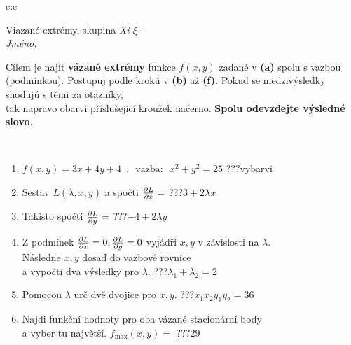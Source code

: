 \documentclass[10pt]{report}
\begin{document}
\begin{tabular}{c:c}
\begin{minipage}[c][104.5mm][t]{0.5\linewidth}
\begin{center}
\vspace{7mm}
{\huge Viazané extrémy, skupina \textit{Xi $\xi$} -}\\[5mm]
\textit{Jméno:}\phantom{xxxxxxxxxxxxxxxxxxxxxxxxxxxxxxxxxxxxxxxxxxxxxxxxxxxxxxxxxxxxxxxxx}\\[5mm]
\begin{minipage}{0.95\linewidth}
\begin{center}
Cílem je najít \textbf{vázané extrémy} funkce $f(x,y)$ zadané v \textbf{(a)} spolu s vazbou (podmínkou). Postupuj podle krokú v \textbf{(b)} až \textbf{(f)}. Pokud se medzivýsledky shodujú s těmi za otazníky,\\tak napravo obarvi příslušející kroužek načerno. \textbf{Spolu odevzdejte výsledné slovo}.
\end{center}
\end{minipage}
\\[1mm]
\begin{minipage}{0.79\linewidth}
\begin{center}
\begin{varwidth}{\linewidth}
\begin{enumerate}
\normalsize
\item $f(x,y)=3x+4y+4 \enspace , \enspace \mathrm{vazba:} \enspace x^2+y^2=25$\quad \dotfill\; ???\;\dotfill \quad vybarvi
\item Sestav $L(\lambda,x,y)$ a spočti $\pdv{L}{x}=$\quad \dotfill\; ???\;\dotfill \quad $3+2\lambda x$
\item Takisto spočti $\pdv{L}{y}=$\quad \dotfill\; ???\;\dotfill \quad $-4+2\lambda y$
\item Z podmínek $\pdv{L}{x}=0 , \pdv{L}{y}=0$ vyjádři $x,y$ v závislosti na $\lambda$.\\ \phantom{xxxxxx}Následne $x,y$ dosaď do vazbové rovnice\\ \phantom{xxxxxx}a vypočti dva výsledky pro $\lambda$.\quad \dotfill\; ???\;\dotfill \quad $\lambda_1+\lambda_2=2$
\item Pomocou $\lambda$ urč dvě dvojice pro $x,y$.\quad \dotfill\; ???\;\dotfill \quad $x_1 x_2 y_1 y_2=36$
\item Najdi funkční hodnoty pro oba vázané stacionární body\\ \phantom{xxxxxx}a vyber tu najvětší. $f_{\text{max}}(x,y)=$\quad \dotfill\; ???\;\dotfill \quad $29$

\end{enumerate}
\end{varwidth}
\end{center}
\end{minipage}
\end{center}
\end{minipage}
\end{tabular}
\end{document}
